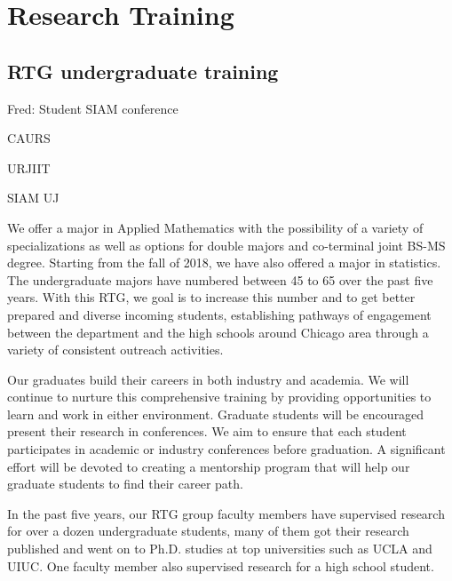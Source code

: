 \documentclass[11pt]{NSFamsart}
\newcommand{\FredNote}[1]{{\color{blue} Fred: #1}}
\begin{document}
\section{Research Training }

\subsection{RTG undergraduate training }

\phantom{a}
\FredNote{Student SIAM conference

CAURS

URJIIT

SIAM UJ}
 
We offer a major in  Applied Mathematics with the possibility of a variety of specializations as well as options for double majors and co-terminal joint BS-MS degree. Starting from the fall of 2018, we have also offered a major in statistics. The undergraduate majors have numbered between 45 to 65 over the past five years. With this RTG, we goal is to increase this number and to get better prepared and diverse incoming students, establishing pathways of engagement between the department and the high schools around Chicago area through a variety of consistent outreach activities.



Our graduates build their careers in both industry and academia. We will continue to nurture this comprehensive training by providing opportunities to learn and work in either environment. Graduate students will be encouraged present their research in conferences. We aim to ensure that each student participates in academic or industry conferences before graduation. A significant effort 
will be devoted to creating a mentorship program that will help our graduate students to find their career path.

In the past five years, our RTG group faculty members have
supervised research for over a dozen undergraduate students, many of them got their research published and went on to Ph.D. studies at top universities such as    UCLA and UIUC.   One faculty member also supervised research for a high school student.  


\end{document}
